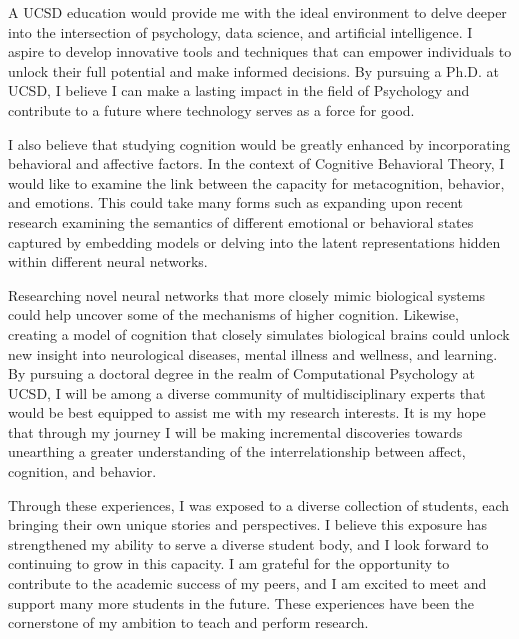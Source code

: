 \documentclass[12pt]{article}
\begin{document}
A UCSD education would provide me with the ideal environment to delve deeper into the intersection of psychology, data science, and
artificial intelligence. I aspire to develop innovative tools and techniques that can empower individuals to unlock their full potential
and make informed decisions. By pursuing a Ph.D. at UCSD, I believe I can make a lasting impact in the field of Psychology and contribute
to a future where technology serves as a force for good.

I also believe that studying cognition would be greatly enhanced by incorporating behavioral and affective factors. In the context of
Cognitive Behavioral Theory, I would like to examine the link between the capacity for metacognition, behavior, and emotions. This could
take many forms such as expanding upon recent research examining the semantics of different emotional or behavioral states captured by
embedding models or delving into the latent representations hidden within different neural networks.

Researching novel neural networks that more closely mimic biological systems could help uncover some of the mechanisms of higher cognition.
Likewise, creating a model of cognition that closely simulates biological brains could unlock new insight into neurological diseases,
mental illness and wellness, and learning. By pursuing a doctoral degree in the realm of Computational Psychology at UCSD, I will be among
a diverse community of multidisciplinary experts that would be best equipped to assist me with my research interests. It is my hope that
through my journey I will be making incremental discoveries towards unearthing a greater understanding of the interrelationship between
affect, cognition, and behavior.

Through these experiences, I was exposed to a diverse collection of students, each bringing their own unique stories and perspectives. I
believe this exposure has strengthened my ability to serve a diverse student body, and I look forward to continuing to grow in this
capacity. I am grateful for the opportunity to contribute to the academic success of my peers, and I am excited to meet and support many
more students in the future. These experiences have been the cornerstone of my ambition to teach and perform research.
\end{document}
